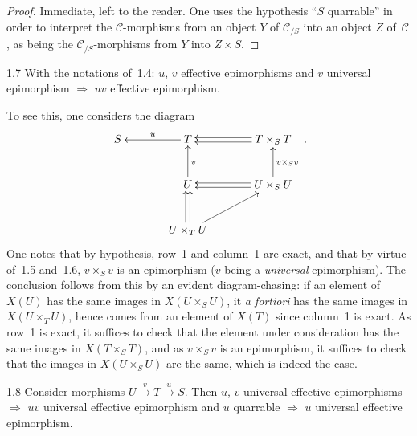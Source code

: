 \begin{proof}
Immediate, left to the reader. One uses the hypothesis ``\(S\) quarrable''
in order to interpret the \(\mathcal{C}\)-morphisms from an object \(Y\)
of \(\mathcal{C}_{/S}\) into an object \(Z\) of~\(\mathcal{C}\), as being the
\(\mathcal{C}_{/S}\)-morphisms from \(Y\) into \(Z\times S\).
\end{proof}

\begin{lemma}{1.7}
\label{IV.1.7}
With the notations of~1.4: \(u\), \(v\) effective epimorphisms and \(v\)
universal epimorphism \(\Rightarrow\) \(uv\) effective epimorphism.
\end{lemma}

To see this, one considers the diagram
\[
\xymatrix@C=3.6em@R=2.6em{
S
  & T \ar[l]_{u}
  & T\times_{S}T \ar@<0.45ex>[l] \ar@<-0.45ex>[l]
\\
  & U \ar[u]_{v}
  & U\times_{S}U \ar[u]_{v\times_{S}v}
      \ar@<0.45ex>[l] \ar@<-0.45ex>[l]
\\
  & U\times_{T}U \ar@<0.45ex>[u] \ar@<-0.45ex>[u] \ar[ur]
  &
}
\,.
\]
One notes that by hypothesis, row~1 and column~1 are exact, and that by
virtue of~1.5 and~1.6, \(v\times_{S}v\) is an epimorphism (\(v\) being a
\emph{universal} epimorphism). The conclusion follows from this by an
evident diagram-chasing: if an element of \(X(U)\) has the same images in
\(X(U\times_{S}U)\), it \emph{a fortiori} has the same images in
\(X(U\times_{T}U)\), hence comes from an element of \(X(T)\) since column~1
is exact. As row~1 is exact, it suffices to check that the element under
consideration has the same images in \(X(T\times_{S}T)\), and as
\(v\times_{S}v\) is an epimorphism, it suffices to check that the images in
\(X(U\times_{S}U)\) are the same, which is indeed the case.

\begin{proposition}{1.8}
\label{IV.1.8}
Consider morphisms \(U\xrightarrow{v}T\xrightarrow{u}S\). Then \(u\), \(v\)
universal effective epimorphisms \(\Rightarrow\) \(uv\) universal effective
epimorphism and \(u\) quarrable \(\Rightarrow\) \(u\) universal effective
epimorphism.
\end{proposition}

